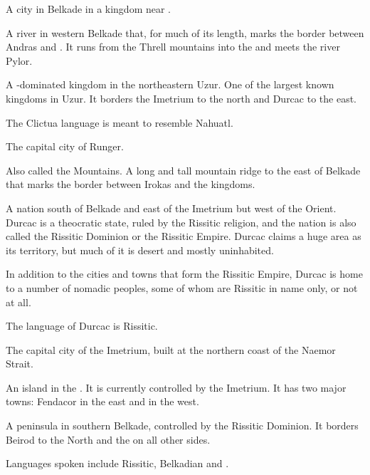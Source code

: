 A city in Belkade in a kingdom near \Redce. 



A river in western Belkade that, for much of its length, marks the border between Andras and \Scyrum{}. It runs from the Threll mountains into the \Risvaelsea{} and meets the river Pylor. 



A \meccaran-dominated kingdom in the northeastern Uzur. One of the largest known kingdoms in Uzur. It borders the Imetrium to the north and Durcac to the east. 

The Clictua language is meant to resemble Nahuatl. 



The capital city of Runger. 



\gitemthe{\Dragonridge}
Also called the \Dragonridge{} Mountains. A long and tall mountain ridge to the east of Belkade that marks the border between Irokas and the \Serpadj{} kingdoms. 



A nation south of Belkade and east of the Imetrium but west of the Orient. Durcac is a theocratic state, ruled by the Rissitic religion, and the nation is also called the Rissitic Dominion or the Rissitic Empire. Durcac claims a huge area as its territory, but much of it is desert and mostly uninhabited. 

In addition to the cities and towns that form the Rissitic Empire, Durcac is home to a number of nomadic peoples, some of whom are Rissitic in name only, or not at all. 

The language of Durcac is Rissitic. 



The capital city of the Imetrium, built at the northern coast of the Naemor Strait. 



An island in the \Risvaelsea. It is currently controlled by the Imetrium. It has two major towns: Fendacor in the east and \Cicora{} in the west.



A peninsula in southern Belkade, controlled by the Rissitic Dominion. It borders Beirod to the North and the \Risvaelsea{} on all other sides. 

Languages spoken include Rissitic, Belkadian and \Ortic. 



